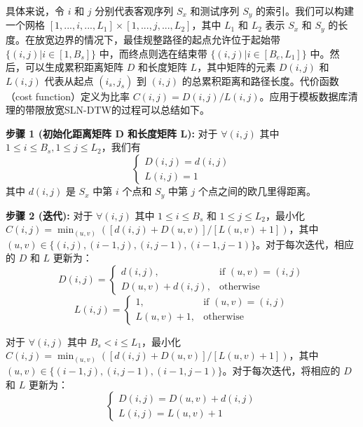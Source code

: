 \documentclass[journal]{IEEEtran}
\begin{document}
具体来说，令 $i$ 和 $j$ 分别代表客观序列 $S_{x}$ 和测试序列 $S_{y}$ 的索引。我们可以构建一个网格 $[1,...,i,...,L_{1}] \times [1,...,j,...,L_{2}]$，其中 $L_{1}$ 和 $L_{2}$ 表示 $S_{x}$ 和 $S_{y}$ 的长度。在放宽边界的情况下，最佳规整路径的起点允许位于起始带 $\{(i,j) | i \in [1, B_{s}]\}$ 中，而终点则选在结束带 $\{(i,j) | i \in [B_{e}, L_{1}]\}$ 中。然后，可以生成累积距离矩阵 $D$ 和长度矩阵 $L$，其中矩阵的元素 $D(i,j)$ 和 $L(i,j)$ 代表从起点 $(i_s, j_s)$ 到 $(i,j)$ 的总累积距离和路径长度。代价函数（cost function）定义为比率 $C(i,j) = D(i,j)/L(i,j)$。应用于模板数据库清理的带限放宽SLN-DTW的过程可以总结如下。

\textbf{步骤 1 (初始化距离矩阵 D 和长度矩阵 L):}
对于 $\forall(i,j)$ 其中 $1 \le i \le B_{s}, 1 \le j \le L_{2}$，我们有
\begin{equation}
\begin{cases}
D(i,j) = d(i,j) \\
L(i,j) = 1
\end{cases}
\end{equation}
其中 $d(i,j)$ 是 $S_{x}$ 中第 $i$ 个点和 $S_{y}$ 中第 $j$ 个点之间的欧几里得距离。

\textbf{步骤 2 (迭代):}
对于 $\forall(i,j)$ 其中 $1 \le i \le B_{s}$ 和 $1 \le j \le L_{2}$，最小化 $C(i,j) = \min_{(u,v)} \left([d(i,j)+D(u,v)]/[L(u,v)+1]\right)$，其中 $(u,v) \in \{(i,j), (i-1,j), (i,j-1), (i-1,j-1)\}$。对于每次迭代，相应的 $D$ 和 $L$ 更新为：
\begin{equation}
D(i,j) = \begin{cases} d(i,j), & \text{if } (u,v)=(i,j) \\ D(u,v)+d(i,j), & \text{otherwise} \end{cases}
\end{equation}
\begin{equation}
L(i,j) = \begin{cases} 1, & \text{if } (u,v)=(i,j) \\ L(u,v)+1, & \text{otherwise} \end{cases}
\end{equation}

对于 $\forall(i,j)$ 其中 $B_{s} < i \le L_{1}$，最小化 $C(i,j) = \min_{(u,v)} \left([d(i,j)+D(u,v)]/[L(u,v)+1]\right)$，其中 $(u,v) \in \{(i-1,j), (i,j-1), (i-1,j-1)\}$。对于每次迭代，将相应的 $D$ 和 $L$ 更新为：
\begin{equation}
\begin{cases}
D(i,j) = D(u,v)+d(i,j) \\
L(i,j) = L(u,v)+1
\end{cases}
\end{equation}
\end{document}
